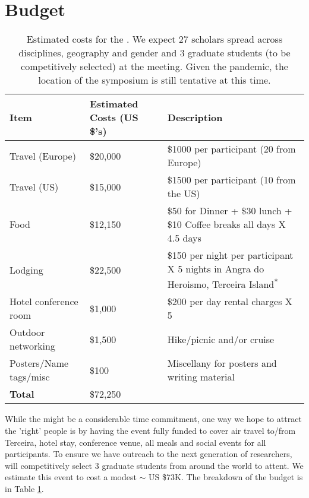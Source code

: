 \section{Budget}
\label{sec:budget}

\begin{table}[!]
  \footnotesize{
    \centering    
    \begin{tabular}{|p{3.5cm}|p{2cm}|p{9.5cm}|}
    \hline 
    \rowcolor{Gray}
    \bfseries Item& \bfseries Estimated Costs (US \$'s)&\bfseries Description\\
    \hline
      Travel (Europe)& \$20,000 & \$1000 per participant (20 from Europe) \\
    \hline
      Travel (US)& \$15,000 & \$1500 per participant (10 from the US) \\
    \hline
      Food& \$12,150 & \$50 for Dinner + \$30 lunch + \$10 Coffee breaks all days X 4.5 days\\
    \hline
      Lodging& \$22,500 & \$150 per night per participant X 5 nights in Angra do Heroismo, Terceira Island\textsuperscript{*}\\
    \hline
      Hotel conference room &\$1,000 & \$200 per day rental charges X 5\\
    \hline
      Outdoor networking& \$1,500 & Hike/picnic and/or cruise\\
    \hline
      Posters/Name tags/misc& \$100 & Miscellany for posters and writing material\\
    \hline
    \textbf{Total}& \$72,250 &\\
    \hline        
  \end{tabular}
  \caption{Estimated costs for the \sympe. We expect 27 scholars
    spread across disciplines, geography and gender and 3 graduate
    students (to be competitively selected) at the
    meeting. \ic{\textsuperscript{*}}Given the pandemic, the location
    of the symposium is still tentative at this time.}
  \label{tab:budget}
}
\end{table}

While the \symp might be a considerable time commitment, one way we
hope to attract the 'right' people is by having the event fully funded
to cover air travel to/from Terceira, hotel stay, conference venue,
all meals and social events for all participants. To ensure we have
outreach to the next generation of researchers, will competitively
select 3 graduate students from around the world to attent. We
estimate this event to cost a modest $\sim$ US \$73K. The breakdown of
the budget is in Table \ref{tab:budget}.

